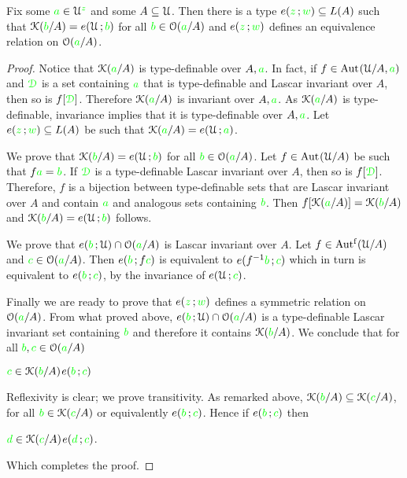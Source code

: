 \begin{proposition}\label{prop_bardotto}
  Fix some ${\color{green} a}\in\EuScript U^{\color{green} z}$ and some $A\subseteq\EuScript U$.
  Then there is a type $e({\color{green} z}\,;{\color{green} w})\subseteq L(A)$ such that $\EuScript K({\color{green} b}/A)=e(\EuScript U\,;{\color{green} b})$ for all ${\color{green} b}\in\EuScript O({\color{green} a}/A)$ and $e({\color{green} z}\,;{\color{green} w})$ defines an equivalence relation on $\EuScript O({\color{green} a}/A)$.
\end{proposition}

\begin{proof}
  Notice that $\EuScript K({\color{green} a}/A)$ is type-definable over $A,{\color{green} a}$.
  In fact, if $f\in{\rm Aut\kern.15ex}(\EuScript U/A,{\color{green} a})$ and ${\color{green}\EuScript D}$ is a set containing ${\color{green} a}$ that is type-definable and Lascar invariant over $A$, then so is $f[{\color{green}\EuScript D}]$.
  Therefore $\EuScript K({\color{green} a}/A)$ is invariant over $A,{\color{green} a}$.
  As $\EuScript K({\color{green} a}/A)$ is type-definable, invariance implies that it is type-definable over $A,{\color{green} a}$.
  Let $e({\color{green} z}\,;{\color{green} w})\subseteq L(A)$ be such that $\EuScript K({\color{green} a}/A)=e(\EuScript U\,;{\color{green} a})$. 
    
  We prove that $\EuScript K({\color{green} b}/A)=e(\EuScript U\,;{\color{green} b})$ for all ${\color{green} b}\in\EuScript O({\color{green} a}/A)$.
  Let $f\in{\rm Aut\kern.15ex}(\EuScript U/A)$ be such that $f{\color{green} a}={\color{green} b}$.
  If ${\color{green}\EuScript D}$ is a type-definable Lascar invariant over $A$, then so is $f[{\color{green}\EuScript D}]$.
  Therefore, $f$ is a bijection between type-definable sets that are Lascar invariant over $A$ and contain ${\color{green} a}$ and analogous sets containing ${\color{green} b}$.
  Then $f[\EuScript K({\color{green} a}/A)]=\EuScript K({\color{green} b}/A)$ and $\EuScript K({\color{green} b}/A)=e(\EuScript U\,;{\color{green} b})$ follows.
    
  We prove that $e({\color{green} b}\,;\EuScript U)\cap \EuScript O({\color{green} a}/A)$ is Lascar invariant over $A$.
  Let $f\in\mbox{Aut$^{\rm f}$}(\EuScript U/A)$ and ${\color{green} c}\in\EuScript O({\color{green} a}/A)$.
  Then $e({\color{green} b}\,;f{\color{green} c})$ is equivalent to  $e(f^{-1}{\color{green} b}\,;{\color{green} c})$ which in turn is equivalent to $e({\color{green} b}\,;{\color{green} c})$, by the invariance of $e(\EuScript U\,;{\color{green} c})$. 
    
  Finally we are ready to prove that $e({\color{green} z}\,;{\color{green} w})$ defines a symmetric relation on $\EuScript O({\color{green} a}/A)$.
  From what proved above, $e({\color{green} b}\,;\EuScript U)\cap \EuScript O({\color{green} a}/A)$ is a type-definable Lascar invariant set containing ${\color{green} b}$ and therefore it contains $\EuScript K({\color{green} b}/A)$.
  We conclude that for all ${\color{green} b},{\color{green} c}\in\EuScript O({\color{green} a}/A)$
  
  \medrel{\iff}${\color{green} c}\in\EuScript K({\color{green} b}/A)$\medrel{\imp}$e({\color{green} b}\,;{\color{green} c})$
  
  Reflexivity is clear; we prove transitivity.
  As remarked above, $\EuScript K({\color{green} b}/A)\subseteq\EuScript K({\color{green} c}/A)$, for all ${\color{green} b}\in\EuScript K({\color{green} c}/A)$ or equivalently $e({\color{green} b}\,;{\color{green} c})$.
  Hence if $e({\color{green} b}\,;{\color{green} c})$ then
  
  \medrel{\iff}${\color{green} d}\in\EuScript K({\color{green} c}/A)$\medrel{\imp}$e({\color{green} d}\,;{\color{green} c})$.
    
  Which completes the proof.
\end{proof}

